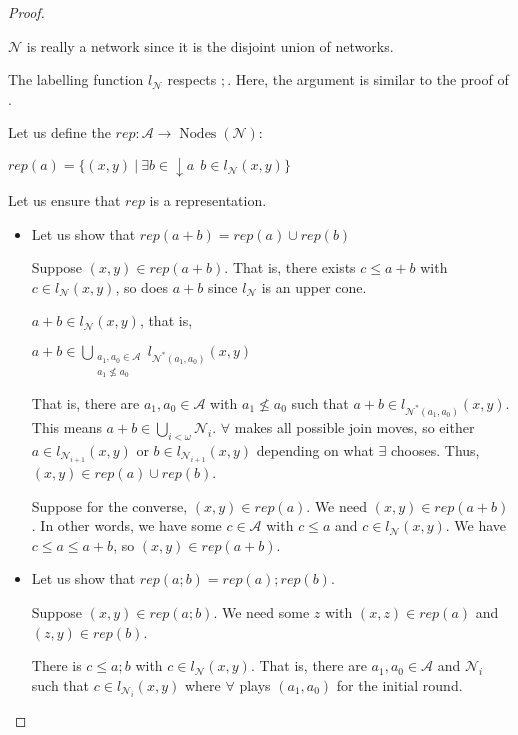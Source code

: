 \documentclass[a4paper]{article}
\theoremstyle{definition}
\theoremstyle{theorem}
\theoremstyle{proposition}
\theoremstyle{lemma}
\theoremstyle{ex}
\theoremstyle{corollary}
\theoremstyle{claim}
\begin{document}
\begin{proof}
\begin{enumerate}
    $\mathcal{N}$ is really a network since it is the disjoint union of networks.

    The labelling function $l_{\mathcal{N}}$ respects $;$. Here, the argument is similar to the proof of \cite[Proposition 5]{hirsch2005class}.

    Let us define the $rep : \mathcal{A} \to \operatorname{Nodes}(\mathcal{N})$:
    \begin{center}
      $rep(a) = \{ (x, y) \: | \: \exists b \in \downarrow a \:\: b \in l_{\mathcal{N}}(x, y)\}$
    \end{center}

    Let us ensure that $rep$ is a representation.

    \begin{itemize}
  \item Let us show that $rep(a + b) = rep(a) \cup rep(b)$

  Suppose $(x, y) \in rep(a + b)$. That is, there exists $c \leq a + b$ with $c \in l_{\mathcal{N}}(x, y)$, so does $a + b$ since $l_{\mathcal{N}}$ is an upper cone.

  $a + b \in l_{\mathcal{N}}(x, y)$, that is,

\begin{center}
$a + b \in \bigcup \limits_{ \substack{a_1, a_0 \in \mathcal{A} \\ a_1 \not\leq a_0}} l_{\mathcal{N}^{*}(a_1, a_0)}(x,y)$
\end{center}

That is, there are $a_1, a_0 \in \mathcal{A}$ with $a_1 \not\leq a_0$ such that $a + b \in l_{\mathcal{N}^{*}(a_1, a_0)}(x,y)$.
This means $a + b \in \bigcup \limits_{i < \omega} \mathcal{N}_i$.
$\forall$ makes all possible join moves, so either $a \in l_{\mathcal{N}_{i + 1}}(x, y)$ or $b \in l_{\mathcal{N}_{i + 1}}(x, y)$ depending on what $\exists$ chooses.
Thus, $(x, y) \in rep(a) \cup rep(b)$.

Suppose for the converse, $(x, y) \in rep(a)$. We need $(x, y) \in rep(a + b)$.
In other words, we have some $c \in \mathcal{A}$ with $c \leq a$ and $c \in l_{\mathcal{N}}(x, y)$.
We have $c \leq a \leq a + b$, so $(x, y) \in rep(a + b)$.

\item Let us show that $rep(a ; b) = rep(a) ; rep(b)$.

Suppose $(x, y) \in rep(a ; b)$. We need some $z$ with $(x, z) \in rep(a)$ and $(z, y) \in rep(b)$.

There is $c \leq a ; b$ with $c \in l_{\mathcal{N}}(x,y)$. That is, there are $a_1, a_0 \in \mathcal{A}$ and $\mathcal{N}_i$ such that $c \in l_{\mathcal{N}_i}(x, y)$ where $\forall$ plays $(a_1, a_0)$ for the initial round.


\end{itemize}
\end{enumerate}
\end{proof}
\end{document}
